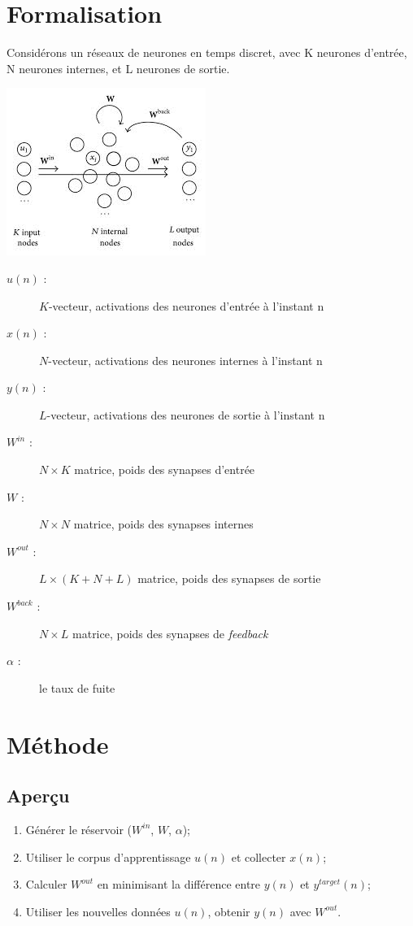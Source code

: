 \documentclass[12pt]{article}
\begin{document}
\section{Formalisation}
Considérons un réseaux de neurones en temps discret, avec K neurones d'entrée, N neurones internes, et L neurones de sortie.\newline
\begin{center}
\includegraphics[scale=0.5]{esn.jpeg}
\end{center}
\begin{description}
\item[$u(n)$ :] $K$-vecteur, activations des neurones d'entrée à l'instant n
\item[$x(n)$ :] $N$-vecteur, activations des neurones internes à l'instant n
\item[$y(n)$ :] $L$-vecteur, activations des neurones de sortie à l'instant n
\item[$W^{in}$ :] $N \times K$ matrice, poids des synapses d'entrée
\item[$W$ :] $N \times N$ matrice, poids des synapses internes
\item[$W^{out}$ :] $L \times (K + N + L)$ matrice, poids des synapses de sortie
\item[$W^{back}$ :] $N \times L$ matrice, poids des synapses de \textit{feedback}
\item[$\alpha$ :] le taux de fuite
\end{description}


\section{Méthode}
\subsection{Aperçu}
\begin{enumerate}
\item Générer le réservoir ($W^{in}$, $W$, $\alpha$);
\item Utiliser le corpus d'apprentissage $u(n)$ et collecter $x(n)$;
\item Calculer $W^{out}$ en minimisant la différence entre  $y(n)$ et $y^{target}(n)$;
\item Utiliser les nouvelles données $u(n)$, obtenir  $y(n)$ avec $W^{out}$.
\end{enumerate}
\end{document}
